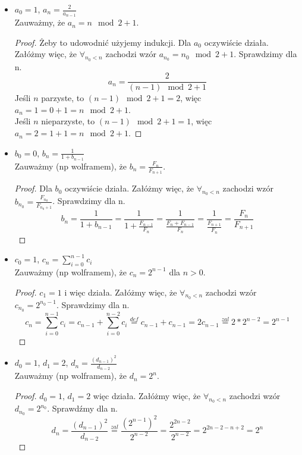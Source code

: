 \documentclass[a4paper]{article}
\begin{document}
\begin{itemize}
\item $a_0=1$, $a_n=\frac{2}{a_{n-1}}$\\
Zauważmy, że $a_n=n \mod{2} + 1$. 
\begin{proof}
Żeby to udowodnić użyjemy indukcji. Dla $a_0$ oczywiście działa. Załóżmy więc, że $\forall_{n_0<n}$ zachodzi wzór $a_{n_0}=n_0 \mod{2} + 1$. Sprawdzimy dla n.\\
$$a_n=\frac{2}{(n-1) \mod{2} + 1}$$
Jeśli $n$ parzyste, to $(n-1) \mod{2} + 1 = 2$, więc $a_n=1=0 + 1 = n \mod{2} + 1$.\\
Jeśli $n$ nieparzyste, to $(n-1) \mod{2} + 1 = 1$, więc $a_n=2=1+1=n \mod{2} + 1$.
\end{proof}

\item $b_0=0$, $b_n=\frac{1}{1+b_{n-1}}$\\
Zauważmy (np wolframem), że $b_n=\frac{F_n}{F_{n+1}}$.
\begin{proof}
Dla $b_0$ oczywiście działa. Załóżmy więc, że $\forall_{n_0<n}$ zachodzi wzór $b_{n_0}=\frac{F_{n_0}}{F_{n_0+1}}$. Sprawdzimy dla n.\\
$$b_n=\frac{1}{1+b_{n-1}} = \frac{1}{1+\frac{F_{n-1}}{F_{n}}}= \frac{1}{\frac{F_n+F_{n-1}}{F_{n}}} = \frac{1}{\frac{F_{n+1}}{F_{n}}}=\frac{F_{n}}{F_{n+1}}$$
\end{proof}
\clearpage
\item $c_0=1$, $c_n=\sum_{i=0}^{n-1}c_i$\\
Zauważmy (np wolframem), że $c_n=2^{n-1}$ dla $n>0$.
\begin{proof}
$c_1=1$ i więc działa. Załóżmy więc, że $\forall_{n_0<n}$ zachodzi wzór $c_{n_0}=2^{n_0-1}$. Sprawdzimy dla n.\\
$$c_n=\sum\limits_{i=0}^{n-1}c_i = c_{n-1} + \sum_{i=0}^{n-2} c_i \overset{def}{=}c_{n-1}+c_{n-1}=2c_{n-1} \overset{zal}{=} 2*2^{n-2}=2^{n-1}$$
\end{proof}

\item $d_0=1$, $d_1=2$, $d_n=\frac{(d_{n-1})^2}{d_{n-2}}$\\
Zauważmy (np wolframem), że $d_n=2^n$.
\begin{proof}
$d_0=1$, $d_1=2$ więc działa. Załóżmy więc, że $\forall_{n_0<n}$ zachodzi wzór $d_{n_0}=2^{n_0}$. Sprawdźmy dla n.\\
$$d_n=\frac{(d_{n-1})^2}{d_{n-2}}\overset{zal}{=}\frac{(2^{n-1})^2}{2^{n-2}}=\frac{2^{2n-2}}{2^{n-2}}=2^{2n-2-n+2}=2^{n}$$
\end{proof}
\end{itemize}
\end{document}
